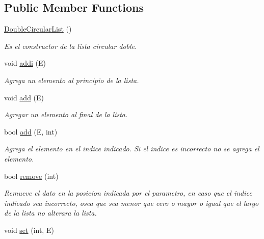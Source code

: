 \subsection*{Public Member Functions}
\begin{DoxyCompactItemize}
\item 
\hypertarget{class_double_circular_list_a533876254e3c837d556542eda9968f8b}{\hyperlink{class_double_circular_list_a533876254e3c837d556542eda9968f8b}{Double\-Circular\-List} ()}\label{class_double_circular_list_a533876254e3c837d556542eda9968f8b}

\begin{DoxyCompactList}\small\item\em Es el constructor de la lista circular doble. \end{DoxyCompactList}\item 
void \hyperlink{class_double_circular_list_ade2ef68a86a8deef4cb43d38e031906b}{addi} (E)
\begin{DoxyCompactList}\small\item\em Agrega un elemento al principio de la lista. \end{DoxyCompactList}\item 
void \hyperlink{class_double_circular_list_a7691d38e77ea44d222c465f27e7d05b6}{add} (E)
\begin{DoxyCompactList}\small\item\em Agregar un elemento al final de la lista. \end{DoxyCompactList}\item 
bool \hyperlink{class_double_circular_list_a6d76f7045dd9997f55c6c2feb80678da}{add} (E, int)
\begin{DoxyCompactList}\small\item\em Agrega el elemento en el indice indicado. Si el indice es incorrecto no se agrega el elemento. \end{DoxyCompactList}\item 
bool \hyperlink{class_double_circular_list_ae7ed8b6714720cb7daafa639f232ecc3}{remove} (int)
\begin{DoxyCompactList}\small\item\em Remueve el dato en la posicion indicada por el parametro, en caso que el indice indicado sea incorrecto, osea que sea menor que cero o mayor o igual que el largo de la lista no alterara la lista. \end{DoxyCompactList}\item 
void \hyperlink{class_double_circular_list_a95e0f27bda1158233015ee3ff27b3ade}{set} (int, E)

\end{DoxyCompactItemize}
